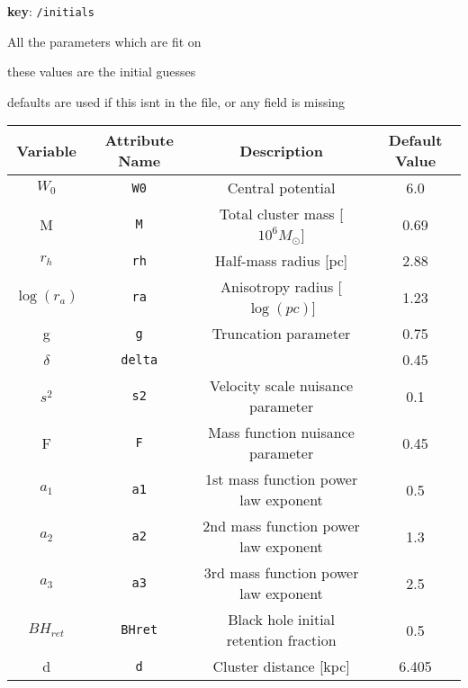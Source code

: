 
\textbf{key}: \texttt{/initials}

All the parameters which are fit on

these values are the initial guesses

defaults are used if this isnt in the file, or any field is missing


\begin{center}
\begin{table}[H]
\begin{tabular}{ | c | c | c | c | }
    \hline
    Variable & Attribute Name & Description & Default Value \\
    \hline\hline
    \(W_0\) & \texttt{W0} & Central potential & 6.0 \\
    \hline
    M & \texttt{M} & Total cluster mass [\(10^6 M_{\odot}\)] & 0.69 \\
    \hline
    \(r_h\) & \texttt{rh} & Half-mass radius [pc] & 2.88 \\
    \hline
    \(\log(r_a)\) & \texttt{ra} & Anisotropy radius [\(\log(pc)\)] & 1.23 \\
    \hline
    g & \texttt{g} & Truncation parameter & 0.75 \\
    \hline
    \(\delta\) & \texttt{delta} & & 0.45 \\
    \hline
    \(s^2\) & \texttt{s2} & Velocity scale nuisance parameter & 0.1 \\
    \hline
    F & \texttt{F} & Mass function nuisance parameter & 0.45 \\
    \hline
    \(a_1\) & \texttt{a1} & 1st mass function power law exponent & 0.5 \\
    \hline
    \(a_2\) & \texttt{a2} & 2nd mass function power law exponent & 1.3 \\
    \hline
    \(a_3\) & \texttt{a3} & 3rd mass function power law exponent & 2.5 \\
    \hline
    \(BH_{ret}\)&\texttt{BHret} & Black hole initial retention fraction & 0.5 \\
    \hline
    d & \texttt{d} & Cluster distance [kpc] & 6.405 \\
    \hline
\end{tabular}
\end{table}
\end{center}